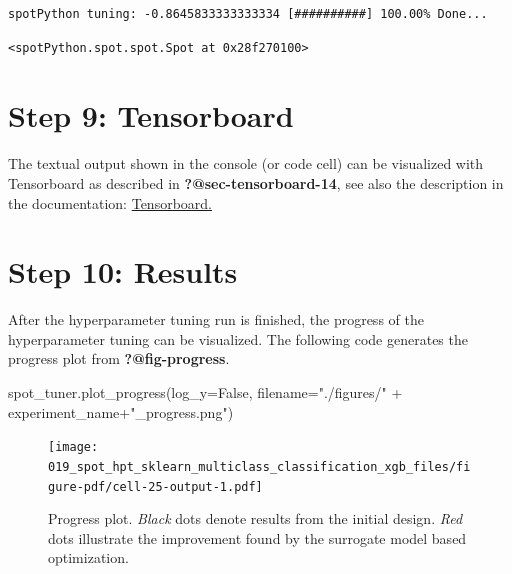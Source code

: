 \documentclass[
  letterpaper,
  DIV=11,
  numbers=noendperiod]{scrreprt}
\newenvironment{Shaded}{\begin{snugshade}}{\end{snugshade}}
\newcommand{\NormalTok}[1]{\textcolor[rgb]{0.00,0.23,0.31}{#1}}
\newcommand{\OperatorTok}[1]{\textcolor[rgb]{0.37,0.37,0.37}{#1}}
\newcommand{\StringTok}[1]{\textcolor[rgb]{0.13,0.47,0.30}{#1}}
\newcommand{\VariableTok}[1]{\textcolor[rgb]{0.07,0.07,0.07}{#1}}
\begin{document}
\begin{verbatim}
spotPython tuning: -0.8645833333333334 [##########] 100.00% Done...
\end{verbatim}

\begin{verbatim}
<spotPython.spot.spot.Spot at 0x28f270100>
\end{verbatim}

\hypertarget{sec-tensorboard-17}{%
\section{Step 9: Tensorboard}\label{sec-tensorboard-17}}

The textual output shown in the console (or code cell) can be visualized
with Tensorboard as described in \textbf{?@sec-tensorboard-14}, see also
the description in the documentation:
\href{https://sequential-parameter-optimization.github.io/spotPython/14_spot_ray_hpt_torch_cifar10.html\#sec-tensorboard-14}{Tensorboard.}

\hypertarget{sec-results-tuning-17}{%
\section{Step 10: Results}\label{sec-results-tuning-17}}

After the hyperparameter tuning run is finished, the progress of the
hyperparameter tuning can be visualized. The following code generates
the progress plot from \textbf{?@fig-progress}.

\begin{Shaded}
\begin{Highlighting}[]
\NormalTok{spot\_tuner.plot\_progress(log\_y}\OperatorTok{=}\VariableTok{False}\NormalTok{,}
\NormalTok{    filename}\OperatorTok{=}\StringTok{"./figures/"} \OperatorTok{+}\NormalTok{ experiment\_name}\OperatorTok{+}\StringTok{"\_progress.png"}\NormalTok{)}
\end{Highlighting}
\end{Shaded}

\begin{figure}[H]

{\centering \texttt{[image: 019\_spot\_hpt\_sklearn\_multiclass\_classification\_xgb\_files/figure-pdf/cell-25-output-1.pdf]}

}

\caption{Progress plot. \emph{Black} dots denote results from the
initial design. \emph{Red} dots illustrate the improvement found by the
surrogate model based optimization.}

\end{figure}
\end{document}
